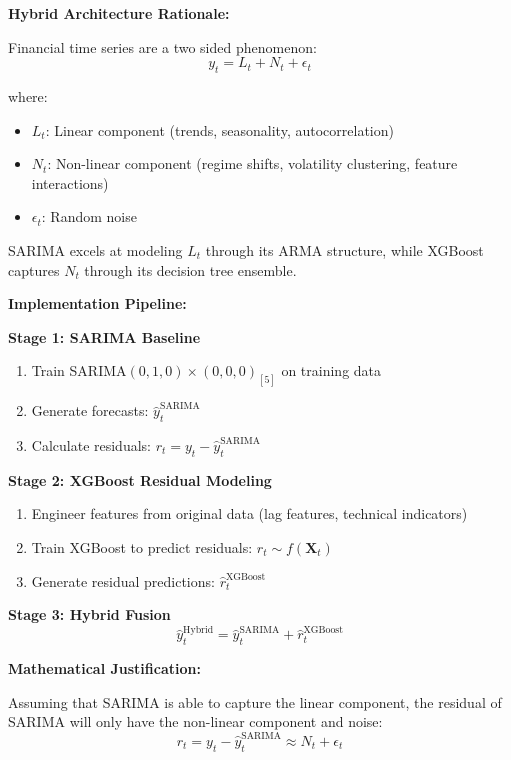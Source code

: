 \documentclass[12pt,a4paper]{article}
\begin{document}
\textbf{Hybrid Architecture Rationale:}

Financial time series are a two sided phenomenon:
\begin{equation}
y_t = L_t + N_t + \epsilon_t
\end{equation}

where:
\begin{itemize}
    \item $L_t$: Linear component (trends, seasonality, autocorrelation)
    \item $N_t$: Non-linear component (regime shifts, volatility clustering, feature interactions)
    \item $\epsilon_t$: Random noise
\end{itemize}

SARIMA excels at modeling $L_t$ through its ARMA structure, while XGBoost captures $N_t$ through its decision tree ensemble.

\textbf{Implementation Pipeline:}

\textbf{Stage 1: SARIMA Baseline}
\begin{enumerate}
    \item Train SARIMA$(0,1,0) \times (0,0,0)_{[5]}$ on training data
    \item Generate forecasts: $\hat{y}_t^{\text{SARIMA}}$
    \item Calculate residuals: $r_t = y_t - \hat{y}_t^{\text{SARIMA}}$
\end{enumerate}

\textbf{Stage 2: XGBoost Residual Modeling}
\begin{enumerate}
    \item Engineer features from original data (lag features, technical indicators)
    \item Train XGBoost to predict residuals: $r_t \sim f(\mathbf{X}_t)$
    \item Generate residual predictions: $\hat{r}_t^{\text{XGBoost}}$
\end{enumerate}

\textbf{Stage 3: Hybrid Fusion}
\begin{equation}
\hat{y}_t^{\text{Hybrid}} = \hat{y}_t^{\text{SARIMA}} + \hat{r}_t^{\text{XGBoost}}
\end{equation}

\textbf{Mathematical Justification:}

Assuming that SARIMA is able to capture the linear component, the residual of SARIMA will only have the non-linear component and noise:
\begin{equation}
r_t = y_t - \hat{y}_t^{\text{SARIMA}} \approx N_t + \epsilon_t
\end{equation}
\end{document}
